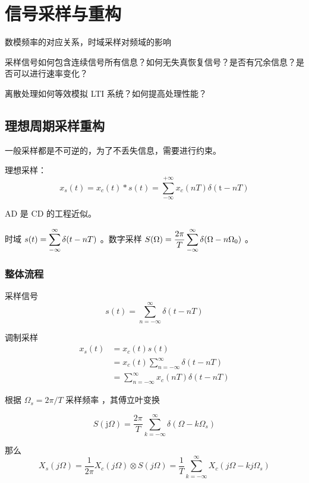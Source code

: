 \documentclass[cn,11pt,chinese,black,simple]{../elegantbook}
\begin{document}
\fi 
\def\chapname{03sampandrebuild}

\chapter{信号采样与重构}

\begin{introduction}
    \item 数模频率的对应关系，时域采样对频域的影响
    \item 采样信号如何包含连续信号所有信息？如何无失真恢复信号？是否有冗余信息？是否可以进行速率变化？
    \item 离散处理如何等效模拟 LTI 系统？如何提高处理性能？
\end{introduction}

\section{理想周期采样重构}

一般采样都是不可逆的，为了不丢失信息，需要进行约束。

理想采样： \[x_{s}(t)=x_{c}(t) * s(t)=\sum_{-\infty}^{+\infty} x_{c}(n T) \delta(\mathrm{t}-n T)\]

AD 是 CD 的工程近似。

时域 \(s(t) = \displaystyle\sum_{-\infty}^\infty \delta(t-nT)\) 。数字采样 \(S(\Omega) = \dfrac{2 \pi}{T} \displaystyle\sum_{-\infty}^\infty \delta(\Omega - n \Omega_0)\) 。

\subsection{整体流程}

采样信号 \[s(t)=\sum_{n=-\infty}^{\infty} \delta(t-n T)\]

调制采样 \[\begin{aligned}
    x_{s}(t) &=x_{c}(t) s(t) \\
    &=x_{c}(t) \sum_{n=-\infty}^{\infty} \delta(t-n T) \\
    &= \sum_{n=-\infty}^{\infty} x_c(nT) \delta(t-n T) 
    \end{aligned}\]

根据 \(\Omega_s = 2\pi / T\) 采样频率 ，其傅立叶变换

\[S(\mathrm{j} \Omega)=\frac{2 \pi}{T} \sum_{k=-\infty}^{\infty} \delta\left(\Omega-k \Omega_{s}\right)\]

那么 \[X_s(j\Omega) = \frac{1}{2\pi} X_c(j\Omega) \otimes S(j\Omega) = \frac{1}{T} \sum_{k=-\infty}^\infty X_c(j\Omega - kj\Omega_s)\] 
\end{document}
